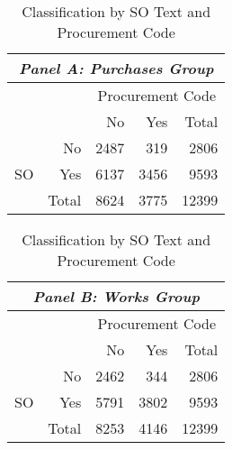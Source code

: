 \begin{table}[!htbp]
  \caption{\label{tab:textbycode}Classification by SO Text and Procurement Code}
  \centering
  \scriptsize
  \begin{tabular}{cr|rrr}
    \hline

    \hline
    \multicolumn{5}{c}{\emph{Panel A: Purchases Group}} \T \B \\
    \hline
    & & \multicolumn{3}{c}{Procurement Code} \T \B \\
    & & No  & Yes  & Total \T \B \\
    \hline
    \multirow[c]{4}{*}{\begin{sideways}SO\end{sideways}} & No & 2487 & 319 & 2806  \T \B \\
    & Yes   & 6137 & 3456 & 9593  \T \B \\
    & Total & 8624 & 3775 & 12399 \T \B \\
    \hline

    \hline
  \end{tabular} \hspace{6pt} \begin{tabular}{cr|rrr}
    \hline

    \hline
    \multicolumn{5}{c}{\emph{Panel B: Works Group}} \T \B \\
    \hline
    & & \multicolumn{3}{c}{Procurement Code} \T \B \\
    & & No  & Yes  & Total \T \B \\
    \hline
    \multirow[c]{4}{*}{\begin{sideways}SO\end{sideways}} & No & 2462 & 344 & 2806  \T \B \\
    & Yes   & 5791 & 3802 & 9593  \T \B \\
    & Total & 8253 & 4146 & 12399 \T \B \\
    \hline

    \hline
  \end{tabular}
\end{table}